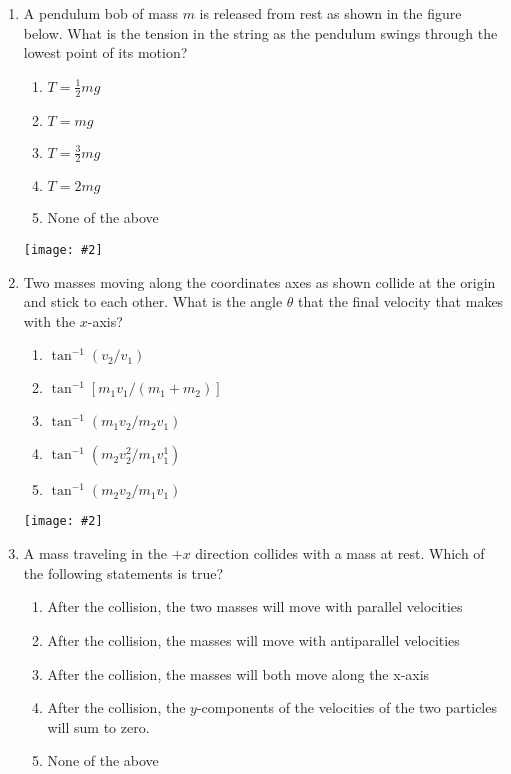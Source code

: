 \documentclass[12pt]{article}
\newcommand{\pic}[2]{\texttt{[image: \#2]}}
\begin{document}
\begin{enumerate}[leftmargin=15pt]
\item A pendulum bob of mass $m$ is released from rest as shown in the figure
  below. What is the tension in the string as the pendulum swings through the
  lowest point of its motion?\\
  \begin{minipage}{.5\textwidth}
    \begin{enumerate}[noitemsep,topsep=0pt]
    \item $T=\frac{1}{2}mg$
    \item $T=mg$
    \item $T=\frac{3}{2}mg$
    \item $T=2mg$
    \item None of the above
    \end{enumerate}
  \end{minipage}
  \begin{minipage}{.3\textwidth}
    \pic{.6}{pendulum1.png}
  \end{minipage}

\item Two masses moving along the coordinates axes as shown collide at the
  origin and stick to each other. What is the angle $\theta$ that the final
  velocity that makes with the $x$-axis?\\
  \begin{minipage}{.5\textwidth}
    \begin{enumerate}[noitemsep,topsep=0pt]
    \item $\tan^{-1}(v_2/v_1)$
    \item $\tan^{-1}[m_1v_1/(m_1+m_2)]$
    \item $\tan^{-1}(m_1v_2/m_2v_1)$
    \item $\tan^{-1}(m_2v_2^2/m_1v_1^1)$
    \item $\tan^{-1}(m_2v_2/m_1v_1)$
    \end{enumerate}
  \end{minipage}
  \begin{minipage}{.35\textwidth}
    \pic{1}{collision1.png}
  \end{minipage}

\item A mass traveling in the $+x$ direction collides with a mass at rest. Which
  of the following statements is true?
  \begin{enumerate}[noitemsep,topsep=0pt]
  \item After the collision, the two masses will move with parallel velocities
  \item After the collision, the masses will move with antiparallel velocities
  \item After the collision, the masses will both move along the x-axis
  \item After the collision, the $y$-components of the velocities of the two
    particles will sum to zero.
  \item None of the above
  \end{enumerate}


\end{enumerate}
\end{document}
